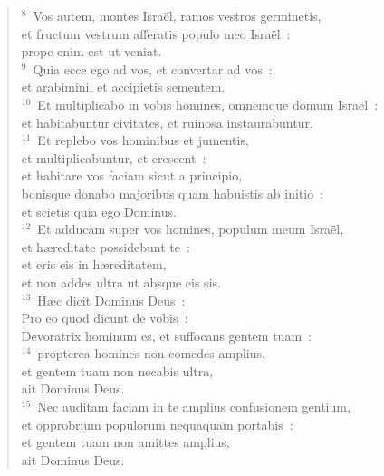 \begin{flushleft}
\begin{verse}
${}^{8}$~Vos autem, montes Isra\"el, ramos vestros germinetis,\\ et fructum vestrum afferatis populo meo Isra\"el~:\\ prope enim est ut veniat.\\
${}^{9}$~Quia ecce ego ad vos, et convertar ad vos~:\\ et arabimini, et accipietis sementem.\\
${}^{10}$~Et multiplicabo in vobis homines, omnemque domum Isra\"el~:\\ et habitabuntur civitates, et ruinosa instaurabuntur.\\
${}^{11}$~Et replebo vos hominibus et jumentis,\\ et multiplicabuntur, et crescent~:\\ et habitare vos faciam sicut a principio,\\ bonisque donabo majoribus quam habuistis ab initio~:\\ et scietis quia ego Dominus.\\
${}^{12}$~Et adducam super vos homines, populum meum Isra\"el,\\ et h\ae reditate possidebunt te~:\\ et eris eis in h\ae reditatem,\\ et non addes ultra ut absque eis sis.\\
${}^{13}$~H\ae c dicit Dominus Deus~:\\ Pro eo quod dicunt de vobis~:\\ Devoratrix hominum es, et suffocans gentem tuam~:\\
${}^{14}$~propterea homines non comedes amplius,\\ et gentem tuam non necabis ultra,\\ ait Dominus Deus.\\
${}^{15}$~Nec auditam faciam in te amplius confusionem gentium,\\ et opprobrium populorum nequaquam portabis~:\\ et gentem tuam non amittes amplius,\\ ait Dominus Deus.\end{verse}\end{flushleft}


